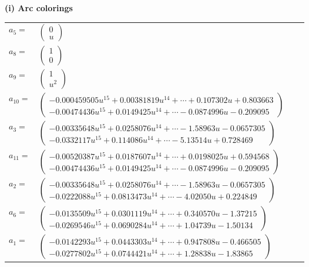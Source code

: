 \documentclass[1p]{elsarticle_modified}
\theoremstyle{definition}
\begin{document}
\flushleft \textbf{(i) Arc colorings}\\
\begin{tabular}{m{7pt} m{180pt} m{7pt} m{180pt} }
\flushright $a_{5}=$&$\begin{pmatrix}0\\u\end{pmatrix}$ \\
\flushright $a_{8}=$&$\begin{pmatrix}1\\0\end{pmatrix}$ \\
\flushright $a_{9}=$&$\begin{pmatrix}1\\u^2\end{pmatrix}$ \\
\flushright $a_{10}=$&$\begin{pmatrix}-0.000459505 u^{15}+0.00381819 u^{14}+\cdots+0.107302 u+0.803663\\-0.00474436 u^{15}+0.0149425 u^{14}+\cdots-0.0874996 u-0.209095\end{pmatrix}$ \\
\flushright $a_{3}=$&$\begin{pmatrix}-0.00335648 u^{15}+0.0258076 u^{14}+\cdots-1.58963 u-0.0657305\\-0.0332117 u^{15}+0.114086 u^{14}+\cdots-5.13514 u+0.728469\end{pmatrix}$ \\
\flushright $a_{11}=$&$\begin{pmatrix}-0.00520387 u^{15}+0.0187607 u^{14}+\cdots+0.0198025 u+0.594568\\-0.00474436 u^{15}+0.0149425 u^{14}+\cdots-0.0874996 u-0.209095\end{pmatrix}$ \\
\flushright $a_{2}=$&$\begin{pmatrix}-0.00335648 u^{15}+0.0258076 u^{14}+\cdots-1.58963 u-0.0657305\\-0.0222088 u^{15}+0.0813473 u^{14}+\cdots-4.02050 u+0.224849\end{pmatrix}$ \\
\flushright $a_{6}=$&$\begin{pmatrix}-0.0135509 u^{15}+0.0301119 u^{14}+\cdots+0.340570 u-1.37215\\-0.0269546 u^{15}+0.0690284 u^{14}+\cdots+1.04739 u-1.50134\end{pmatrix}$ \\
\flushright $a_{1}=$&$\begin{pmatrix}-0.0142293 u^{15}+0.0443303 u^{14}+\cdots+0.947808 u-0.466505\\-0.0277802 u^{15}+0.0744421 u^{14}+\cdots+1.28838 u-1.83865\end{pmatrix}$ \\

\end{tabular}
\end{document}
